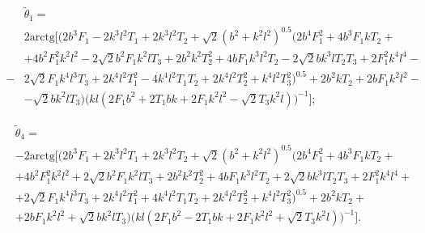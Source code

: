 \begin{equation}
\begin{aligned}
&\tilde \theta_1 = \\&2\text{arctg} \Big[\Big(2b^3F_1 - 2k^3l^2T_1 + 2k^3l^2T_2 + \sqrt{2}(b^2 + k^2l^2)^{0.5}
(2b^4F_1^2 + 4b^3F_1kT_2 +\\&+ 4b^2F_1^2k^2l^2 - 2\sqrt{2}b^2F_1k^2lT_3 + 2b^2k^2T_2^2 + 4bF_1k^3l^2T_2 - 2\sqrt{2}bk^3lT_2T_3 + 2F_1^2k^4l^4 - \\ -&2\sqrt{2}F_1k^4l^3T_3 + 2k^4l^2T_1^2 - 4k^4l^2T_1T_2 + 2k^4l^2T_2^2 + k^4l^2T_3^2)^{0.5} + 2b^2kT_2 + 2bF_1k^2l^2 - \\& -\sqrt{2}bk^2lT_3 \Big) \Big(kl(2F_1b^2 + 2T_1bk + 2F_1k^2l^2 - \sqrt{2}T_3k^2l)\Big)^{-1}\Big];
\end{aligned}
\end{equation}

\begin{equation} \label{eq:app_em_solve_end}
\begin{aligned}
&\tilde \theta_4 = \\&-2\text{arctg}\Big[\Big(2b^3F_1 + 2k^3l^2T_1 + 2k^3l^2T_2 + \sqrt{2}(b^2 + k^2l^2)^{0.5}(2b^4F_1^2 +  4b^3F_1kT_2  +\\& +4b^2F_1^2k^2l^2 + 2\sqrt{2}b^2F_1k^2lT_3 + 2b^2k^2T_2^2 + 4bF_1k^3l^2T_2 + 2\sqrt{2}bk^3lT_2T_3 + 2F_1^2k^4l^4 + \\& +2\sqrt{2}F_1k^4l^3T_3 + 2k^4l^2T_1^2 + 4k^4l^2T_1T_2 + 2k^4l^2T_2^2 + k^4l^2T_3^2)^{0.5} + 2b^2kT_2 + \\&+2bF_1k^2l^2 +\sqrt{2}bk^2lT_3\Big)\Big(kl(2F_1b^2 - 2T_1bk + 2F_1k^2l^2 + \sqrt{2}T_3k^2l)\Big)^{-1}\Big].
\end{aligned}
\end{equation}


